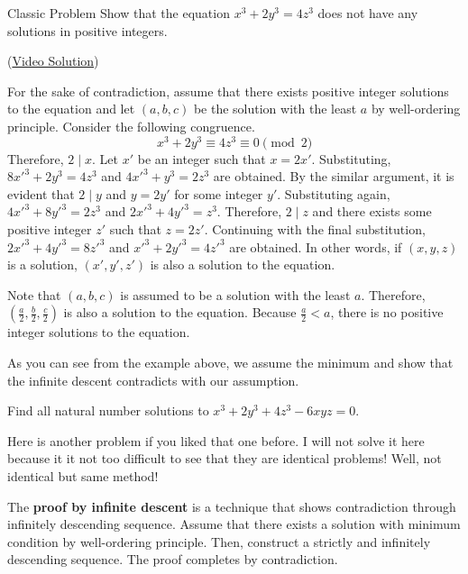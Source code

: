 \documentclass[../../../main.tex]{subfiles}
\begin{document}
\begin{problem}{Classic Problem}{}
Show that the equation $x^3 + 2y^3 = 4z^3$ does not have any
solutions in positive integers.
\end{problem}
(\href{https://youtu.be/UJR56wT0NIM}{Video Solution})
\begin{solution}
For the sake of contradiction, assume that there exists positive
integer solutions to the equation and let $(a, b, c)$ be the
solution with the least $a$ by well-ordering principle.
Consider the following congruence.
\[
x^3 + 2y^3 \equiv 4z^3 \equiv 0 \pmod{2}
\]
Therefore, $2 \mid x$. Let $x'$ be an integer such that $x = 2x'$.
Substituting, $8x'^3 + 2y^3 = 4z^3$ and $4x'^3 + y^3 = 2z^3$ are
obtained. By the similar argument, it is evident that $2 \mid y$
and $y = 2y'$ for some integer $y'$. Substituting again,
$4x'^3 + 8y'^3 = 2z^3$ and $2x'^3 + 4y'^3 = z^3$. Therefore,
$2 \mid z$ and there exists some positive integer $z'$ such that
$z = 2z'$. Continuing with the final substitution,
$2x'^3 + 4y'^3 = 8z'^3$ and $x'^3 + 2y'^3 = 4z'^3$ are obtained.
In other words, if $(x, y, z)$ is a solution, $(x', y', z')$ is
also a solution to the equation.

Note that $(a, b, c)$ is assumed to be a solution with the least $a$.
Therefore, $(\frac{a}{2}, \frac{b}{2}, \frac{c}{2})$ is also a
solution to the equation. Because $\frac{a}{2} < a$, there is no
positive integer solutions to the equation.
\end{solution}

As you can see from the example above, we assume the minimum
and show that the infinite descent contradicts with our assumption.

\begin{problem}{}{}
Find all natural number solutions to $x^3 + 2y^3 + 4z^3 - 6xyz = 0$.
\end{problem}

Here is another problem if you liked that one before. I will not
solve it here because it it not too difficult to see that they are
identical problems! Well, not identical but same method!

\begin{definition}{}{}
The \textbf{proof by infinite descent} is a technique that shows
contradiction through infinitely descending sequence. Assume that
there exists a solution with minimum condition by well-ordering
principle. Then, construct a strictly and infinitely descending
sequence. The proof completes by contradiction.
\end{definition}
\end{document}

